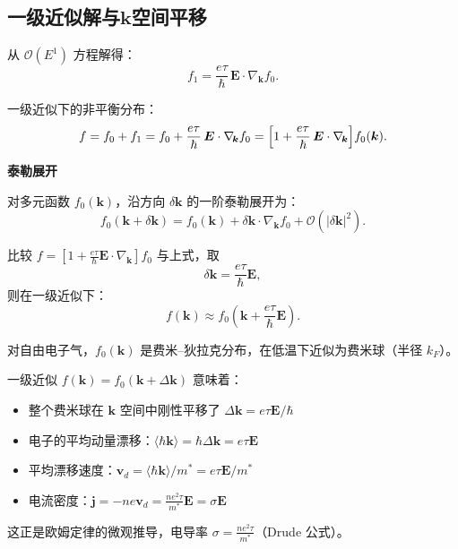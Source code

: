 \subsection{一级近似解与$\bm{k}$空间平移}

\begin{derivationbox}
从 $\mathcal{O}(E^1)$ 方程解得：
\[
f_1 = \frac{e\tau}{\hbar}\,\bm{E} \cdot \nabla_{\!\bm{k}}f_0.
\]

一级近似下的非平衡分布：
\[
f = f_0 + f_1 = f_0 + \frac{e\tau}{\hbar}\,\bm{E} \cdot \nabla_{\!\bm{k}}f_0 = \Bigl[1 + \frac{e\tau}{\hbar}\,\bm{E} \cdot \nabla_{\!\bm{k}}\Bigr]f_0(\bm{k}).
\]

\textbf{泰勒展开}

对多元函数 $f_0(\bm{k})$，沿方向 $\delta\bm{k}$ 的一阶泰勒展开为：
\[
f_0(\bm{k} + \delta\bm{k}) = f_0(\bm{k}) + \delta\bm{k} \cdot \nabla_{\!\bm{k}}f_0 + \mathcal{O}(|\delta\bm{k}|^2).
\]

比较 $f = [1 + \frac{e\tau}{\hbar}\bm{E} \cdot \nabla_{\!\bm{k}}]f_0$ 与上式，取
\[
\delta\bm{k} = \frac{e\tau}{\hbar}\bm{E},
\]
则在一级近似下：
\[
f(\bm{k}) \approx f_0\!\left(\bm{k} + \frac{e\tau}{\hbar}\bm{E}\right).
\]
\end{derivationbox}

\begin{insightbox}
对自由电子气，$f_0(\bm{k})$ 是费米--狄拉克分布，在低温下近似为费米球（半径 $k_F$）。

一级近似 $f(\bm{k}) = f_0(\bm{k} + \Delta\bm{k})$ 意味着：
\begin{itemize}
    \item 整个费米球在 $\bm{k}$ 空间中刚性平移了 $\Delta\bm{k} = e\tau\bm{E}/\hbar$
    \item 电子的平均动量漂移：$\langle\hbar\bm{k}\rangle = \hbar\Delta\bm{k} = e\tau\bm{E}$
    \item 平均漂移速度：$\bm{v}_d = \langle\hbar\bm{k}\rangle/m^* = e\tau\bm{E}/m^*$
    \item 电流密度：$\displaystyle \bm{j} = -ne\bm{v}_d = \frac{ne^2\tau}{m^*}\bm{E} = \sigma\bm{E}$
\end{itemize}

这正是欧姆定律的微观推导，电导率 $\displaystyle \sigma = \frac{ne^2\tau}{m^*}$（Drude 公式）。
\end{insightbox}
